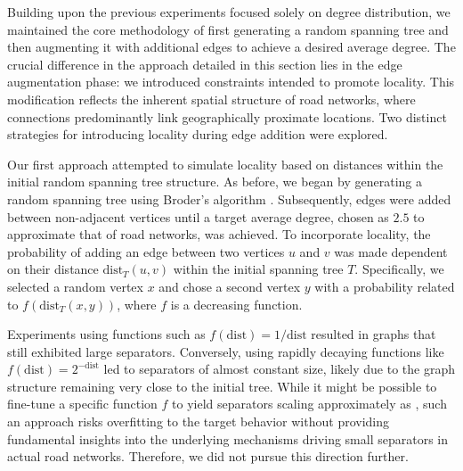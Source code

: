 Building upon the previous experiments focused solely on degree distribution, we maintained the core methodology of first generating a random spanning tree and then augmenting it with additional edges to achieve a desired average degree.
The crucial difference in the approach detailed in this section lies in the edge augmentation phase: we introduced constraints intended to promote locality.
This modification reflects the inherent spatial structure of road networks, where connections predominantly link geographically proximate locations.
Two distinct strategies for introducing locality during edge addition were explored.

Our first approach attempted to simulate locality based on distances within the initial random spanning tree structure.
As before, we began by generating a random spanning tree using Broder's algorithm \cite{broder_generating_1989}.
Subsequently, edges were added between non-adjacent vertices until a target average degree, chosen as \(2.5\) to approximate that of road networks, was achieved.
To incorporate locality, the probability of adding an edge between two vertices \(u\) and \(v\) was made dependent on their distance \( \text{dist}_T(u, v) \) within the initial spanning tree \(T\).
Specifically, we selected a random vertex \(x\) and chose a second vertex \(y\) with a probability related to \(f(\text{dist}_T(x, y))\), where \(f\) is a decreasing function.

Experiments using functions such as \( f(\text{dist}) = 1/\text{dist} \) resulted in graphs that still exhibited large separators.
Conversely, using rapidly decaying functions like \( f(\text{dist}) = 2^{-\text{dist}} \) led to separators of almost constant size, likely due to the graph structure remaining very close to the initial tree.
While it might be possible to fine-tune a specific function \(f\) to yield separators scaling approximately as , such an approach risks overfitting to the target behavior without providing fundamental insights into the underlying mechanisms driving small separators in actual road networks.
Therefore, we did not pursue this direction further.


